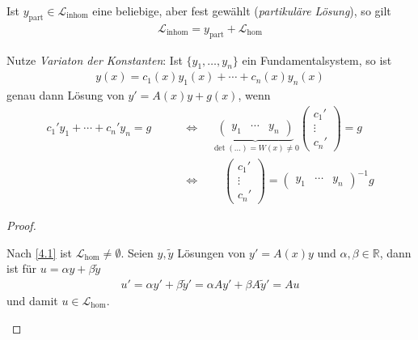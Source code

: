 \begin{theorem}[Satz]
\begin{enum-arab}
\begin{enum-alph}
      Ist $y_{\text{part}} \in \mathcal L_{\text{inhom}}$ eine beliebige, aber fest gewählt (\emph{partikuläre Lösung}), so gilt
      \begin{align*}
        \mathcal L_{\text{inhom}} = y_{\text{part}} + \mathcal L_{\text{hom}}
      \end{align*}
    \item
      Nutze \emph{Variaton der Konstanten}:
      Ist $\{y_1,\dotsc, y_n\}$ ein Fundamentalsystem, so ist
      \begin{align*}
        y(x) = c_1(x) y_1(x) + \dotsb + c_n(x) y_n(x)
      \end{align*}
      genau dann Lösung von $y' = A(x)y + g(x)$, wenn
      \begin{align*}
        c_1'y_1 + \dotsb + c_n'y_n = g
        \qquad &\iff \quad
        \underbrace{\begin{pmatrix}
            y_1 & \cdots & y_n
          \end{pmatrix}}_{\det(\dotsc) = W(x) \neq 0} \begin{pmatrix}
          c_1' \\ \vdots \\ c_n'
        \end{pmatrix} = g \\
        & \iff \qquad \begin{pmatrix}
          c_1' \\ \vdots \\ c_n'
        \end{pmatrix} = \begin{pmatrix}
          y_1 & \cdots & y_n
        \end{pmatrix}^{-1} g
      \end{align*}
    \end{enum-alph}
  \end{enum-arab}
  \begin{proof}
    \begin{enum-arab}
    \item
      \begin{enum-alph}
      \item
        Nach \ref{4.1} ist $\mathcal L_{\text{hom}} \neq \emptyset$.
        Seien $y, \tilde y$ Lösungen von $y' = A(x)y$ und $\alpha, \beta \in \mathbb{R}$, dann ist für $u = \alpha y + \beta \tilde y$
        \begin{align*}
          u' = \alpha y' + \beta \tilde y' = \alpha Ay' + \beta A \tilde y' = Au
        \end{align*}
        und damit $u \in \mathcal L_{\text{hom}}$.

\end{enum-alph}
\end{enum-arab}
\end{proof}
\end{theorem}
